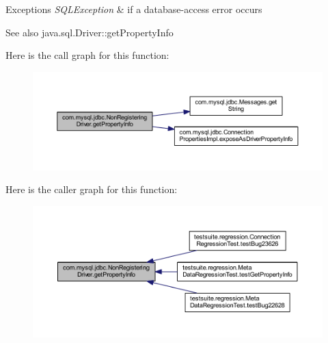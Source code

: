 \begin{DoxyExceptions}{Exceptions}
{\em S\+Q\+L\+Exception} & if a database-\/access error occurs\\
\hline
\end{DoxyExceptions}
\begin{DoxySeeAlso}{See also}
java.\+sql.\+Driver\+::get\+Property\+Info 
\end{DoxySeeAlso}
Here is the call graph for this function\+:
\nopagebreak
\begin{figure}[H]
\begin{center}
\leavevmode
\includegraphics[width=350pt]{classcom_1_1mysql_1_1jdbc_1_1_non_registering_driver_a726bb5014e1cdfffa313257781d4496d_cgraph}
\end{center}
\end{figure}
Here is the caller graph for this function\+:
\nopagebreak
\begin{figure}[H]
\begin{center}
\leavevmode
\includegraphics[width=350pt]{classcom_1_1mysql_1_1jdbc_1_1_non_registering_driver_a726bb5014e1cdfffa313257781d4496d_icgraph}
\end{center}
\end{figure}
\mbox{\label{classcom_1_1mysql_1_1jdbc_1_1_non_registering_driver_a3b94f70cb8b81fa3c6691fde8a63b776}} 
